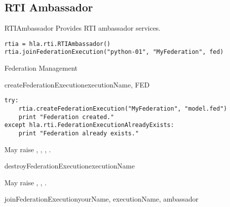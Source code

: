\subsection{RTI Ambassador}

\begin{classdesc}{RTIAmbassador}{}
Provides RTI ambassador services.

\begin{verbatim}
rtia = hla.rti.RTIAmbassador()
rtia.joinFederationExecution("python-01", "MyFederation", fed)
\end{verbatim}

\begin{hlamsc}{Federation Management}

\nextlevel
{}
\nextlevel
{}
\nextlevel
{}
\nextlevel
{}
\nextlevel
{}
\nextlevel
{}
\nextlevel
{}
\nextlevel
{}
\nextlevel
{}
\nextlevel
\end{hlamsc}

\begin{methoddesc}{createFederationExecution}{executionName, FED}

\begin{verbatim} 
try:
    rtia.createFederationExecution("MyFederation", "model.fed")
    print "Federation created."
except hla.rti.FederationExecutionAlreadyExists:
    print "Federation already exists."
\end{verbatim}

May raise
,
,
,
.
\end{methoddesc}

\begin{methoddesc}{destroyFederationExecution}{executionName}

May raise
,
,
.
\end{methoddesc}

\begin{methoddesc}{joinFederationExecution}{yourName, executionName, ambassador}


\end{methoddesc}
\end{classdesc}
